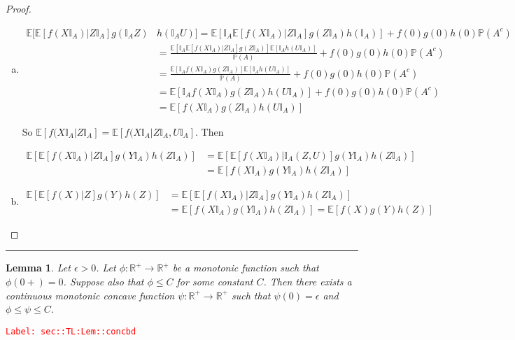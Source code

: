 \documentclass[12pt]{article}
\newcommand{\mb}{\mathbb}
\newcommand{\ra}{\rightarrow}
\newcommand{\ep}{\epsilon}
\newcommand{\tr}{\textcolor{red}}
\newcommand{\labe}[1]{\tr{\texttt{Label: #1}}}
\newcommand{\lin}{\rule{\linewidth}{0.4 pt}}
\newcommand{\pr}{\mb{P}}							%
\newcommand{\ex}[1]{\mb{E}\left[#1\right]}			%
\newcommand{\X}{X}								%
\newcommand{\XX}{Y}								%
\newcommand{\XXX}{Z}							%
\newcommand{\typset}{A}							%
\newtheorem{lem}[thms]{Lemma}
\begin{document}
\begin{proof}
\begin{enumerate}[(a)]
By linearity, this also holds for all bounded and measurable \(f,g\) and \(h\) with no restrictions on \(f(0),g(0),h(0)\), so the proof is complete.

\item 

\begin{align*}
\mb{E}\bigg[\ex{f(\X\mb{I}_\typset)| \XXX\mb{I}_\typset}g(\mb{I}_\typset\XXX)&h(\mb{I}_\typset U)\bigg] = \ex{\mb{I}_\typset\ex{f(\X\mb{I}_\typset)|\XXX\mb{I}_\typset}g(\XXX\mb{I}_\typset)h(\mb{I}_\typset)} + f(0)g(0)h(0)\pr(\typset^c)\\
&=\frac{\ex{\mb{I}_\typset\ex{f(\X\mb{I}_\typset)|\XXX\mb{I}_\typset}g(\XXX\mb{I}_\typset)}\ex{\mb{I}_\typset h(U\mb{I}_\typset)}}{\pr(\typset)} + f(0)g(0)h(0)\pr(\typset^c)\\
&=\frac{\ex{\mb{I}_\typset f(\X\mb{I}_\typset)g(\XXX\mb{I}_\typset)}\ex{\mb{I}_\typset h(U\mb{I}_\typset)}}{\pr(\typset)} + f(0)g(0)h(0)\pr(\typset^c)\\
&=\ex{\mb{I}_\typset f(\X\mb{I}_\typset)g(\XXX\mb{I}_\typset)h(U\mb{I}_\typset)} + f(0)g(0)h(0)\pr(\typset^c)\\
&= \ex{f(\X\mb{I}_\typset)g(\XXX\mb{I}_\typset)h(U\mb{I}_\typset)}
\end{align*}

So \(\ex{f(\X\mb{I}_\typset|\XXX\mb{I}_\typset} = \ex{f(\X\mb{I}_\typset|\XXX\mb{I}_\typset,U\mb{I}_\typset}\). Then 

\begin{align*}
\ex{\ex{f(\X\mb{I}_\typset)|\XXX\mb{I}_\typset}g(\XX\mb{I}_\typset)h(\XXX\mb{I}_\typset)} &= \ex{\ex{f(\X\mb{I}_\typset)|\mb{I}_\typset(\XXX,U)}g(\XX\mb{I}_\typset)h(\XXX\mb{I}_\typset)}\\
&=\ex{f(\X\mb{I}_\typset)g(\XX\mb{I}_\typset)h(\XXX\mb{I}_\typset)}
\end{align*}

\item 
\begin{align*}
\ex{\ex{f(\X)|\XXX}g(\XX)h(\XXX)} &= \ex{\ex{f(\X\mb{I}_\typset)|\XXX\mb{I}_\typset}g(\XX\mb{I}_\typset)h(\XXX\mb{I}_\typset)}\\
&= \ex{f(\X\mb{I}_\typset)g(\XX\mb{I}_\typset)h(\XXX\mb{I}_\typset)} = \ex{f(\X)g(\XX)h(\XXX)}
\end{align*}
\end{enumerate}
\end{proof}

\lin

\begin{lem}
Let \(\ep >0\). Let \(\phi: \mb{R}^+ \ra \mb{R}^+\) be a monotonic function such that \(\phi(0+) = 0\). Suppose also that \(\phi \leq C\) for some constant \(C\). Then there exists a continuous monotonic concave function \(\psi:\mb{R}^+\ra \mb{R}^+\) such that \(\psi(0) = \ep\) and \(\phi \leq \psi\leq C\).
\label{sec::TL:Lem::concbd}
\end{lem}
\labe{sec::TL:Lem::concbd}
\end{document}
